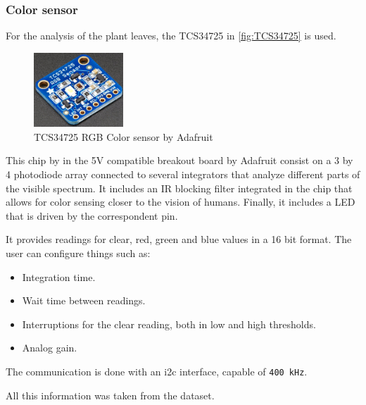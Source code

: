 \subsubsection{Color sensor}
For the analysis of the plant leaves, the TCS34725\cite{TCS34725} in \autoref{fig:TCS34725} is used.
\begin{figure}[H]
    \centering
    \includegraphics[width=0.3\textwidth]{images/3/color.png}
    \caption{TCS34725 RGB Color sensor by Adafruit}
    \label{fig:TCS34725}
\end{figure}
This chip by  in the 5V compatible breakout board by Adafruit consist on a 3 by 4 photodiode array connected to several integrators that analyze different parts of the visible spectrum. It includes an 
IR blocking filter integrated in the chip that allows for color sensing closer to the vision of humans. Finally, it includes a LED that is driven by the correspondent pin.

It provides readings for clear, red, green and blue values in a 16 bit format. The user can configure things such as:
\begin{itemize}
    \item Integration time.
    \item Wait time between readings.
    \item Interruptions for the clear reading, both in low and high thresholds.
    \item Analog gain.
\end{itemize}

The communication is done with an \acrshort{i2c} interface, capable of \texttt{400 kHz}.

All this information was taken from the dataset\cite{TCS34725}.


